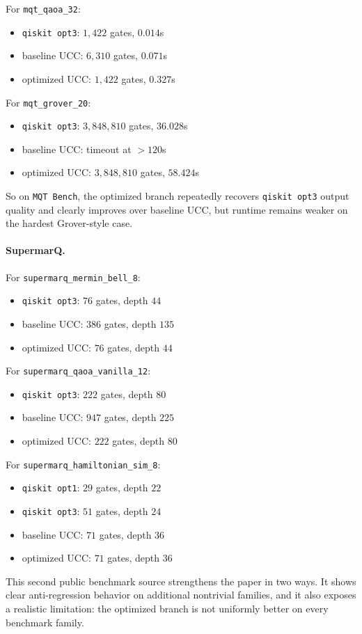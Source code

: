 \documentclass[11pt]{article}
\begin{document}
For \texttt{mqt\_qaoa\_32}:
\begin{itemize}[leftmargin=1.5em]
    \item \texttt{qiskit opt3}: $1{,}422$ gates, $0.014$s
    \item baseline UCC: $6{,}310$ gates, $0.071$s
    \item optimized UCC: $1{,}422$ gates, $0.327$s
\end{itemize}

For \texttt{mqt\_grover\_20}:
\begin{itemize}[leftmargin=1.5em]
    \item \texttt{qiskit opt3}: $3{,}848{,}810$ gates, $36.028$s
    \item baseline UCC: timeout at $>120$s
    \item optimized UCC: $3{,}848{,}810$ gates, $58.424$s
\end{itemize}
So on \texttt{MQT Bench}, the optimized branch repeatedly recovers \texttt{qiskit opt3} output quality and clearly improves over baseline UCC, but runtime remains weaker on the hardest Grover-style case.

\paragraph{SupermarQ.}
For \texttt{supermarq\_mermin\_bell\_8}:
\begin{itemize}[leftmargin=1.5em]
    \item \texttt{qiskit opt3}: $76$ gates, depth $44$
    \item baseline UCC: $386$ gates, depth $135$
    \item optimized UCC: $76$ gates, depth $44$
\end{itemize}

For \texttt{supermarq\_qaoa\_vanilla\_12}:
\begin{itemize}[leftmargin=1.5em]
    \item \texttt{qiskit opt3}: $222$ gates, depth $80$
    \item baseline UCC: $947$ gates, depth $225$
    \item optimized UCC: $222$ gates, depth $80$
\end{itemize}

For \texttt{supermarq\_hamiltonian\_sim\_8}:
\begin{itemize}[leftmargin=1.5em]
    \item \texttt{qiskit opt1}: $29$ gates, depth $22$
    \item \texttt{qiskit opt3}: $51$ gates, depth $24$
    \item baseline UCC: $71$ gates, depth $36$
    \item optimized UCC: $71$ gates, depth $36$
\end{itemize}
This second public benchmark source strengthens the paper in two ways. It shows clear anti-regression behavior on additional nontrivial families, and it also exposes a realistic limitation: the optimized branch is not uniformly better on every benchmark family.
\end{document}
